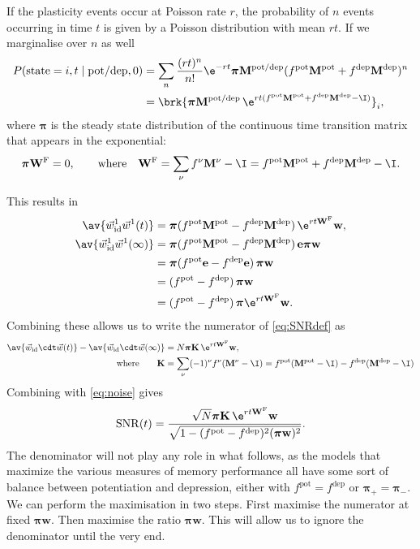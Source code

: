 \documentclass[12pt]{article}
\newcommand{\onev}{\mathbf{e}}
\newcommand{\eq}{\pib}
\newcommand{\pib}{\boldsymbol{\pi}}
\newcommand{\w}{\mathbf{w}}
\newcommand{\W}{\mathbf{W}}
\newcommand{\M}{\mathbf{M}}
\newcommand{\enc}{\mathbf{K}}
\newcommand{\frg}{\W^{\mathrm{F}}}
\newcommand{\pot}{^{\text{pot}}}
\newcommand{\dep}{^{\text{dep}}}
\newcommand{\potdep}{^{\text{pot/dep}}}
\newcommand{\syn}{\vec{w}}
\newcommand{\synid}{\syn_\text{id}}
\DeclareMathOperator{\SNR}{SNR}
\begin{document}
If the plasticity events occur at Poisson rate $r$, the probability of $n$ events occurring in time $t$ is given by a Poisson distribution with mean $rt$.
If we marginalise over $n$ as well
%
\begin{equation}\label{eq:plastseqav}
\begin{aligned}
  P(\text{state}=i,t \mid \text{pot/dep},0)
    &= \sum_n \frac{(rt)^n}{n!} \e^{-rt} \eq \M\potdep (f\pot\M\pot+f\dep\M\dep)^n \\
    &= \brk{ \eq \M\potdep\, \e^{rt(f\pot\M\pot+f\dep\M\dep-\I) } }_i,
\end{aligned}
\end{equation}
%
where $\eq$ is the steady state distribution of the continuous time transition matrix that appears in the exponential:
%
\begin{equation}\label{eq:eq}
  \eq\frg = 0,
  \qquad\text{where}\quad
  \frg = \sum_\nu f^\nu \M^\nu - \I
    = f\pot\M\pot + f\dep\M\dep - \I.
\end{equation}
%



This results in
%
\begin{equation}\label{eq:overlapwt}
\begin{aligned}
  \av{\synid^1 \syn^1(t)} &= \eq (f\pot\M\pot-f\dep\M\dep)\, \e^{rt\frg} \w, \\
  \av{\synid^1 \syn^1(\infty)} &= \eq (f\pot\M\pot-f\dep\M\dep)\, \onev\eq \w \\
         &= \eq (f\pot\onev-f\dep\onev)\, \eq \w \\
         &=  (f\pot-f\dep)\, \eq \w \\
         &=  (f\pot-f\dep)\, \eq \e^{rt\frg} \w .
\end{aligned}
\end{equation}
%
Combining these allows us to write the numerator of \eqref{eq:SNRdef} as
%
\begin{equation}\label{eq:signal}
\begin{aligned}
  \av{\synid \cdt \syn(t)} - \av{\synid \cdt \syn(\infty)}
    &= N \eq \enc \, \e^{rt \frg} \w , \\
    \text{where} \qquad
  \enc &= \sum_\nu (-1)^\nu f^\nu (\M^\nu - \I)
    = f\pot(\M\pot-\I)-f\dep(\M\dep-\I)
\end{aligned}
\end{equation}
%
Combining with \eqref{eq:noise} gives
%
\begin{equation}\label{eq:SNRcurveExact}
  \SNR(t) = \frac{\sqrt{N} \eq \enc\,\e^{rt\frg}\w}
                 {\sqrt{1-(f\pot-f\dep)^2(\eq\w)^2}}.
\end{equation}
%
The denominator will not play any role in what follows, as the models that maximize the various measures of memory performance all have some sort of balance between potentiation and depression, either with $f\pot=f\dep$ or $\eq_+=\eq_-$.
We can perform the maximisation in two steps.
First maximise the numerator at fixed $\eq\w$.
Then maximise the ratio \wrt $\eq\w$.
This will allow us to ignore the denominator until the very end.
\end{document}
